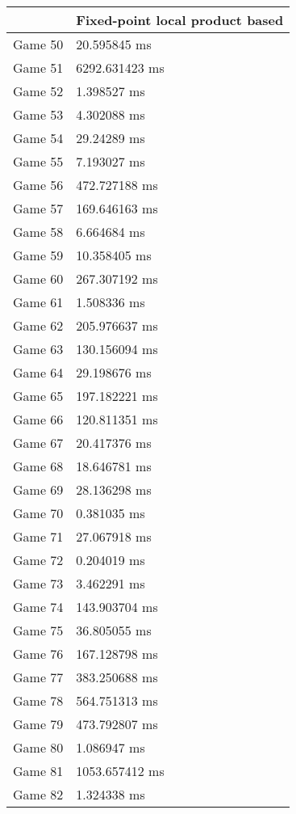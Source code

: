 \begin{tabular}{|l|l|}
	\hline
	& Fixed-point local product based \\ \hline
	Game 50 & 20.595845 ms \\ \hline
	Game 51 & 6292.631423 ms \\ \hline
	Game 52 & 1.398527 ms \\ \hline
	Game 53 & 4.302088 ms \\ \hline
	Game 54 & 29.24289 ms \\ \hline
	Game 55 & 7.193027 ms \\ \hline
	Game 56 & 472.727188 ms \\ \hline
	Game 57 & 169.646163 ms \\ \hline
	Game 58 & 6.664684 ms \\ \hline
	Game 59 & 10.358405 ms \\ \hline
	Game 60 & 267.307192 ms \\ \hline
	Game 61 & 1.508336 ms \\ \hline
	Game 62 & 205.976637 ms \\ \hline
	Game 63 & 130.156094 ms \\ \hline
	Game 64 & 29.198676 ms \\ \hline
	Game 65 & 197.182221 ms \\ \hline
	Game 66 & 120.811351 ms \\ \hline
	Game 67 & 20.417376 ms \\ \hline
	Game 68 & 18.646781 ms \\ \hline
	Game 69 & 28.136298 ms \\ \hline
	Game 70 & 0.381035 ms \\ \hline
	Game 71 & 27.067918 ms \\ \hline
	Game 72 & 0.204019 ms \\ \hline
	Game 73 & 3.462291 ms \\ \hline
	Game 74 & 143.903704 ms \\ \hline
	Game 75 & 36.805055 ms \\ \hline
	Game 76 & 167.128798 ms \\ \hline
	Game 77 & 383.250688 ms \\ \hline
	Game 78 & 564.751313 ms \\ \hline
	Game 79 & 473.792807 ms \\ \hline
	Game 80 & 1.086947 ms \\ \hline
	Game 81 & 1053.657412 ms \\ \hline
	Game 82 & 1.324338 ms \\ \hline

\end{tabular}
